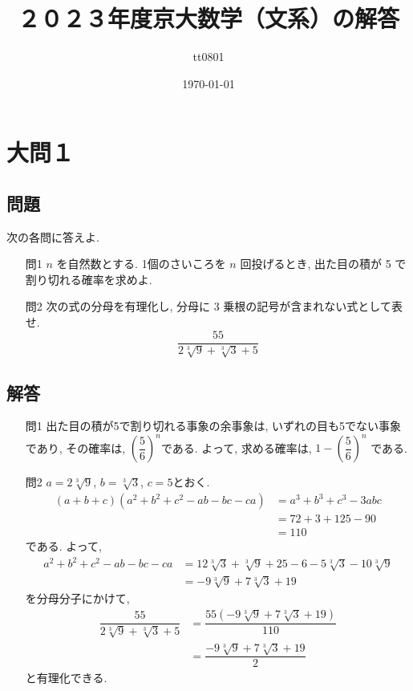 \documentclass[dvipdfmx,a4paper]{jsarticle}
\title{２０２３年度京大数学（文系）の解答}
\author{tt0801}
\date{\today}
\newcommand{\2}{I\hspace{-1pt}I}
\newcommand{\3}{I\hspace{-1pt}I\hspace{-1pt}I}
\begin{document}
    \maketitle
    \section{大問１}
    \subsection{問題}
    次の各問に答えよ. 

    \begin{itemize}
        \item [問1] \quad $n$ を自然数とする. 1個のさいころを $n$ 回投げるとき, 出た目の積が 5 で割り切れる確率を求めよ. 
        \item [問2] \quad 次の式の分母を有理化し, 分母に 3 乗根の記号が含まれない式として表せ. 
            \[
                \frac{55}{2 \sqrt[3]{9} + \sqrt[3]{3} + 5}
            \]
    \end{itemize}

    \subsection{解答}
    \begin{itemize}
        \item [問1] \quad 出た目の積が5で割り切れる事象の余事象は, いずれの目も5でない事象であり, 
            その確率は, $\left(\dfrac{5}{6}\right)^n$である. よって, 求める確率は, $1-\left(\dfrac{5}{6}\right)^n$
            である. 
        \item [問2] \quad $a=2 \sqrt[3]{9}$, $b=\sqrt[3]{3}$, $c=5$とおく. 
        \begin{align*}
            (a + b +c)(a^2 + b^2 + c^2 - ab -bc -ca) &= a^3 + b^3 + c^3 -3abc \\
            &= 72 + 3 + 125 -90 \\
            &= 110
        \end{align*}
        である. よって, 
        \begin{align*}
            a^2 + b^2 + c^2 - ab -bc -ca 
            &= 12 \sqrt[3]{3} + \sqrt[3]{9} + 25 - 6 -5\sqrt[3]{3} - 10\sqrt[3]{9} \\
            &= -9 \sqrt[3]{9} + 7 \sqrt[3]{3} + 19
        \end{align*}
        を分母分子にかけて, 
        \begin{align*}
            \dfrac{55}{2 \sqrt[3]{9} + \sqrt[3]{3} + 5}
            &= \dfrac{55(-9 \sqrt[3]{9} + 7 \sqrt[3]{3} + 19)}{110} \\
            &= \dfrac{-9 \sqrt[3]{9} + 7 \sqrt[3]{3} + 19}{2}
        \end{align*}
        と有理化できる. 
    \end{itemize}
\end{document}
